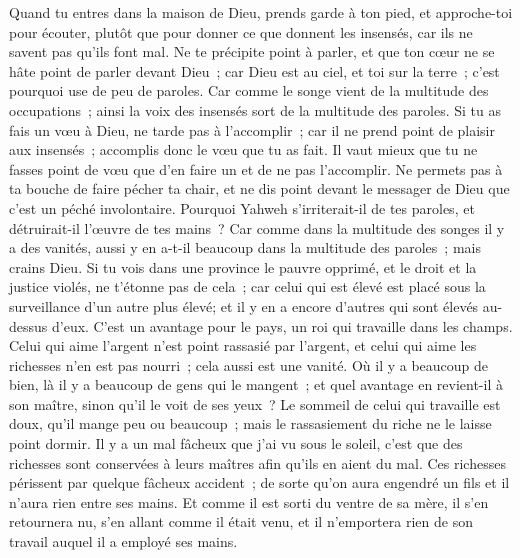\begin{multicols}{2}
Quand tu entres dans la maison de Dieu, prends garde à ton pied, et approche-toi pour écouter, plutôt que pour donner ce que donnent les insensés, car ils ne savent pas qu'ils font mal.
\VerseOne{}Ne te précipite point à parler, et que ton cœur ne se hâte point de parler devant Dieu~; car Dieu est au ciel, et toi sur la terre~; c'est pourquoi use de peu de paroles.
Car comme le songe vient de la multitude des occupations~; ainsi la voix des insensés sort de la multitude des paroles.
Si tu as fais un vœu à Dieu, ne tarde pas à l'accomplir~; car il ne prend point de plaisir aux insensés~; accomplis donc le vœu que tu as fait.
Il vaut mieux que tu ne fasses point de vœu que d'en faire un et de ne pas l'accomplir.
Ne permets pas à ta bouche de faire pécher ta chair, et ne dis point devant le messager de Dieu que c'est un péché involontaire. Pourquoi Yahweh s'irriterait-il de tes paroles, et détruirait-il l'œuvre de tes mains~?
Car comme dans la multitude des songes il y a des vanités, aussi y en a-t-il beaucoup dans la multitude des paroles~; mais crains Dieu.
Si tu vois dans une province le pauvre opprimé, et le droit et la justice violés, ne t'étonne pas de cela~; car celui qui est élevé est placé sous la surveillance d'un autre plus élevé; et il y en a encore d'autres qui sont élevés au-dessus d'eux.
C'est un avantage pour le pays, un roi qui travaille dans les champs.
Celui qui aime l'argent n'est point rassasié par l'argent, et celui qui aime les richesses n'en est pas nourri~; cela aussi est une vanité.
Où il y a beaucoup de bien, là il y a beaucoup de gens qui le mangent~; et quel avantage en revient-il à son maître, sinon qu'il le voit de ses yeux~?
Le sommeil de celui qui travaille est doux, qu'il mange peu ou beaucoup~; mais le rassasiement du riche ne le laisse point dormir.
Il y a un mal fâcheux que j'ai vu sous le soleil, c'est que des richesses sont conservées à leurs maîtres afin qu'ils en aient du mal.
Ces richesses périssent par quelque fâcheux accident~; de sorte qu'on aura engendré un fils et il n'aura rien entre ses mains.
Et comme il est sorti du ventre de sa mère, il s'en retournera nu, s'en allant comme il était venu, et il n'emportera rien de son travail auquel il a employé ses mains.

\end{multicols}
